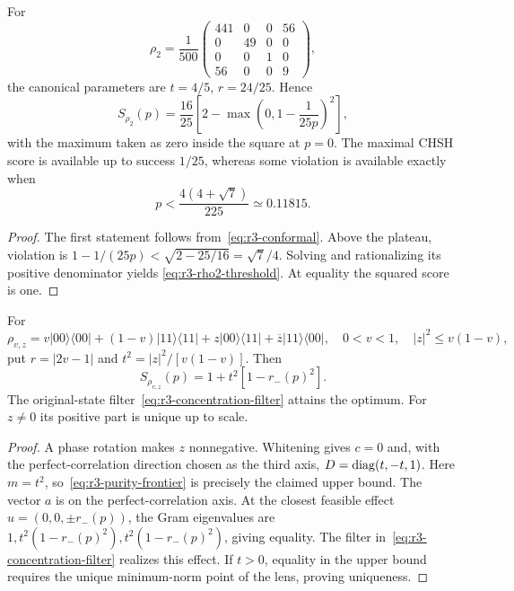 \begin{corollary}
\label{cor:r3-rho2}
For
\[
 \rho_2=\frac1{500}
 \begin{pmatrix}
 441&0&0&56\\0&49&0&0\\0&0&1&0\\56&0&0&9
 \end{pmatrix},
\]
the canonical parameters are $t=4/5$, $r=24/25$. Hence
\begin{equation}
 S_{\rho_2}(p)=\frac{16}{25}
 \left[2-\max\left(0,1-\frac1{25p}\right)^2\right],
 \label{eq:r3-rho2-frontier}
\end{equation}
with the maximum taken as zero inside the square at $p=0$.
The maximal CHSH score is available up to success $1/25$,
whereas some violation is available exactly when
\begin{equation}
 \boxed{\qquad
 p<\frac{4(4+\sqrt7)}{225}\simeq0.11815.
 \qquad}
 \label{eq:r3-rho2-threshold}
\end{equation}
\end{corollary}

\begin{proof}
The first statement follows from~\eqref{eq:r3-conformal}.
Above the plateau, violation is
$1-1/(25p)<\sqrt{2-25/16}=\sqrt7/4$.
Solving and rationalizing its positive denominator yields
\eqref{eq:r3-rho2-threshold}. At equality the squared score is one.
\end{proof}

\begin{theorem}
\label{thm:r3-correlated}
For
\[
 \rho_{v,z}=v|00\rangle\langle00|+(1-v)|11\rangle\langle11|
       +z|00\rangle\langle11|+\overline z|11\rangle\langle00|,
 \quad 0<v<1,\quad |z|^2\le v(1-v),
\]
put $r=|2v-1|$ and $t^2=|z|^2/[v(1-v)]$. Then
\begin{equation}
 \boxed{\qquad
 S_{\rho_{v,z}}(p)=1+t^2[1-r_-(p)^2].
 \qquad}
 \label{eq:r3-correlated}
\end{equation}
The original-state filter~\eqref{eq:r3-concentration-filter} attains
the optimum. For $z\ne0$ its positive part is unique up to scale.
\end{theorem}

\begin{proof}
A phase rotation makes $z$ nonnegative. Whitening gives $c=0$ and,
with the perfect-correlation direction chosen as the third axis,
$D=\operatorname{diag}(t,-t,1)$.
Here $m=t^2$, so~\eqref{eq:r3-purity-frontier} is precisely the
claimed upper bound. The vector $a$ is on the perfect-correlation
axis. At the closest feasible effect $u=(0,0,\pm r_-(p))$,
the Gram eigenvalues are
$1,t^2(1-r_-(p)^2),t^2(1-r_-(p)^2)$, giving equality.
The filter in~\eqref{eq:r3-concentration-filter} realizes this
effect. If $t>0$, equality in the upper bound requires the unique
minimum-norm point of the lens, proving uniqueness.
\end{proof}

